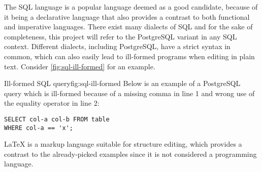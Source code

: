 The SQL language is a popular language deemed as a good candidate, because of it being a declarative language that also provides a contrast to both functional and imperative languages. There exist many dialects of SQL and for the sake of completeness, this project will refer to the PostgreSQL\cite{postgresql-about} variant in any SQL context. Different dialects, including PostgreSQL, have a strict syntax in common, which can also easily lead to ill-formed programs when editing in plain text. Consider \cref{fig:sql-ill-formed} for an example.

\begin{myfigure}{Ill-formed SQL query}{fig:sql-ill-formed}
    Below is an example of a PostgreSQL query which is ill-formed because of a missing comma in line 1 and wrong use of the equality operator in line 2:
    \begin{lstlisting}
SELECT col-a col-b FROM table
WHERE col-a == 'x';
\end{lstlisting}
\end{myfigure}

\LaTeX\cite{latex-about} is a markup language suitable for structure editing, which provides a contrast to the already-picked examples since it is not considered a programming language.
